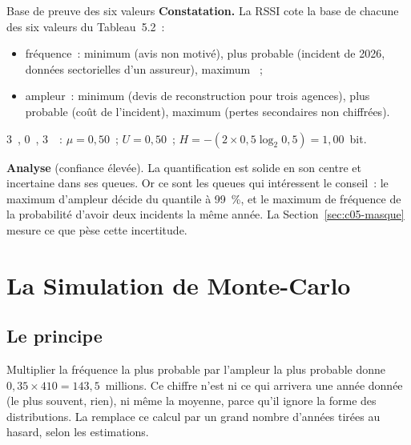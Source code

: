 \begin{boxlecture}{Base de preuve des six valeurs}
\textbf{Constatation.} La RSSI cote la base de chacune des six valeurs
du Tableau~5.2~:
\begin{itemize}
    \item fréquence~: minimum \NEK{} (avis non motivé), plus probable
          \OUI{} (incident de 2026, données sectorielles d'un assureur),
          maximum \NEK{}~;
    \item ampleur~: minimum \OUI{} (devis de reconstruction pour trois
          agences), plus probable \OUI{} (coût de l'incident), maximum
          \NEK{} (pertes secondaires non chiffrées).
\end{itemize}
3~\OUI{}, 0~\NON{}, 3~\NEK{}~: $\mu = 0{,}50$~; $U = 0{,}50$~;
$H = -(2 \times 0{,}5\log_2 0{,}5) = 1{,}00$~bit.

\medskip
\textbf{Analyse} (confiance élevée). La quantification est solide en son
centre et incertaine dans ses queues. Or ce sont les queues qui
intéressent le conseil~: le maximum d'ampleur décide du quantile à
99~\%, et le maximum de fréquence de la probabilité d'avoir deux incidents
la même année. La Section~\ref{sec:c05-masque} mesure ce que pèse cette
incertitude.

\medskip
\hfill{}
\end{boxlecture}

\section{La Simulation de Monte-Carlo}
\label{sec:c05-montecarlo}

\subsection{Le principe}

Multiplier la fréquence la plus probable par l'ampleur la plus probable
donne $0{,}35 \times 410 = 143{,}5$~millions. Ce chiffre n'est ni ce qui
arrivera une année donnée (le plus souvent, rien), ni même la moyenne,
parce qu'il ignore la forme des distributions. La  remplace ce calcul par un
grand nombre d'années tirées au hasard, selon les estimations.

